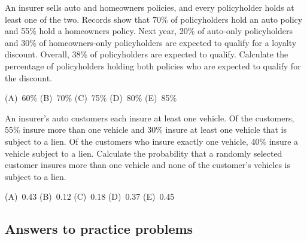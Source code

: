 \begin{practice}
An insurer sells auto and homeowners policies, and every policyholder holds at least one of the
two. Records show that 70\% of policyholders hold an auto policy and 55\% hold a homeowners
policy. Next year, 20\% of auto-only policyholders and 30\% of homeowners-only policyholders are
expected to qualify for a loyalty discount. Overall, 38\% of policyholders are expected to qualify.
Calculate the percentage of policyholders holding both policies who are expected to qualify for
the discount.
\par\smallskip\noindent (A)~60\% \qquad (B)~70\% \qquad (C)~75\% \qquad (D)~80\% \qquad (E)~85\%
\end{practice}

\begin{practice}
An insurer's auto customers each insure at least one vehicle. Of the customers, 55\% insure more
than one vehicle and 30\% insure at least one vehicle that is subject to a lien. Of the customers
who insure exactly one vehicle, 40\% insure a vehicle subject to a lien.
Calculate the probability that a randomly selected customer insures more than one vehicle and none
of the customer's vehicles is subject to a lien.
\par\smallskip\noindent (A)~0.43 \qquad (B)~0.12 \qquad (C)~0.18 \qquad (D)~0.37 \qquad (E)~0.45
\end{practice}

\subsection{Answers to practice problems}

